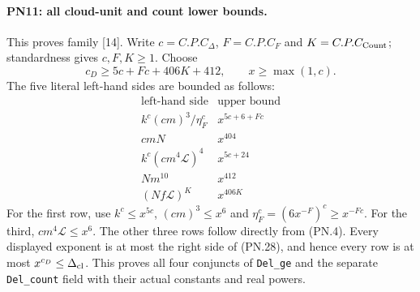 \paragraph{PN11: all cloud-unit and count lower bounds.}
This proves family [14]. Write
$c=C.P.C_\Delta$, $F=C.P.C_F$ and $K=C.P.C_{\rm Count}$;
standardness gives $c,F,K\geq1$. Choose
\[
                 c_D\geq5c+Fc+406K+412,
                 \qquad x\geq\max(1,c).                    \tag{PN.28}
\]
The five literal left-hand sides are bounded as follows:
\[
\begin{array}{c|c}
 \text{left-hand side}&\text{upper bound}\\ \hline
 k^c(cm)^3/\eta_F^c&x^{5c+6+Fc}\\
 cmN&x^{404}\\
 k^c(cm^4\mathcal L)^4&x^{5c+24}\\
 Nm^{10}&x^{412}\\
 (Nf\mathcal L)^K&x^{406K}
\end{array}                                                   \tag{PN.29}
\]
For the first row, use $k^c\leq x^{5c}$,
$(cm)^3\leq x^6$ and
$\eta_F^c=(6x^{-F})^c\geq x^{-Fc}$.
For the third, $cm^4\mathcal L\leq x^6$.
The other three rows follow directly from (PN.4).
Every displayed exponent is at most the right side of (PN.28),
and hence every row is at most $x^{c_D}\leq\Delta_{\rm cl}$.
This proves all four conjuncts of \texttt{Del\_ge} and the separate
\texttt{Del\_count} field with their actual constants and real powers.

